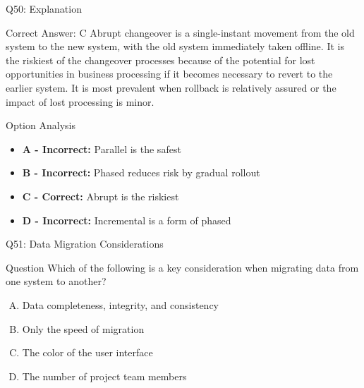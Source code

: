 \documentclass{beamer}
\begin{document}
	\begin{frame}{Q50: Explanation}
		\begin{block}{Correct Answer: C}
			Abrupt changeover is a single-instant movement from the old system to the new system, with the old system immediately taken offline. It is the riskiest of the changeover processes because of the potential for lost opportunities in business processing if it becomes necessary to revert to the earlier system. It is most prevalent when rollback is relatively assured or the impact of lost processing is minor.
		\end{block}
		\begin{block}{Option Analysis}
			\begin{itemize}
				\item \textbf{A - Incorrect:} Parallel is the safest
				\item \textbf{B - Incorrect:} Phased reduces risk by gradual rollout
				\item \textbf{C - Correct:} Abrupt is the riskiest
				\item \textbf{D - Incorrect:} Incremental is a form of phased
			\end{itemize}
		\end{block}
	\end{frame}
	
	\begin{frame}{Q51: Data Migration Considerations}
		\begin{block}{Question}
			Which of the following is a key consideration when migrating data from one system to another?
		\end{block}
		\begin{enumerate}[(A)]
			\item Data completeness, integrity, and consistency
			\item Only the speed of migration
			\item The color of the user interface
			\item The number of project team members
		\end{enumerate}
	\end{frame}
	
\end{document}
